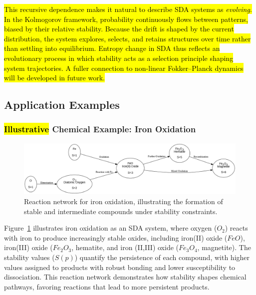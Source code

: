 \documentclass[preprint,12pt]{elsarticle}
\newcommand{\added}[1]{\hl{#1}}
\begin{document}
\added{This recursive dependence makes it natural to describe SDA systems as \emph{evolving}. In the Kolmogorov framework, probability continuously flows between patterns, biased by their relative stability. Because the drift is shaped by the current distribution, the system explores, selects, and retains structures over time rather than settling into equilibrium. Entropy change in SDA thus reflects an evolutionary process in which stability acts as a selection principle shaping system trajectories. A fuller connection to non-linear Fokker–Planck dynamics will be developed in future work.}



\subsection{Application Examples}

\subsubsection{\added{Illustrative} Chemical Example: Iron Oxidation}

\begin{figure}[h]
    \centering
    \includegraphics[width=1\textwidth,height=0.3\textwidth]{figure_13.png}
    \caption{Reaction network for iron oxidation, illustrating the formation of stable and intermediate compounds under stability constraints.}
    \label{fig:figure_13}
\end{figure}

Figure~\ref{fig:figure_13} illustrates iron oxidation as an SDA system, where oxygen (\(O_2\)) reacts with iron to produce increasingly stable oxides, including iron(II) oxide (\(FeO\)), iron(III) oxide (\(Fe_2O_3\), hematite, and iron (II,III) oxide (\(Fe_3O_4\), magnetite). The stability values (\(S(p)\)) quantify the persistence of each compound, with higher values assigned to products with robust bonding and lower susceptibility to dissociation. This reaction network demonstrates how stability shapes chemical pathways, favoring reactions that lead to more persistent products.
\end{document}
